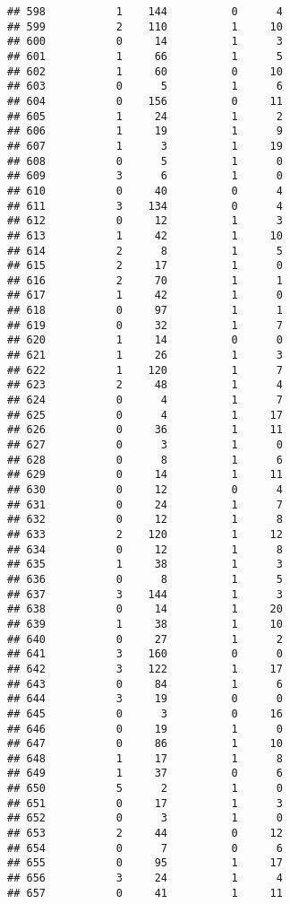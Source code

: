 \documentclass[]{article}
\begin{document}
\begin{verbatim}
## 598           1    144          0      4
## 599           2    110          1     10
## 600           0     14          1      3
## 601           1     66          1      5
## 602           1     60          0     10
## 603           0      5          1      6
## 604           0    156          0     11
## 605           1     24          1      2
## 606           1     19          1      9
## 607           1      3          1     19
## 608           0      5          1      0
## 609           3      6          1      0
## 610           0     40          0      4
## 611           3    134          0      4
## 612           0     12          1      3
## 613           1     42          1     10
## 614           2      8          1      5
## 615           2     17          1      0
## 616           2     70          1      1
## 617           1     42          1      0
## 618           0     97          1      1
## 619           0     32          1      7
## 620           1     14          0      0
## 621           1     26          1      3
## 622           1    120          1      7
## 623           2     48          1      4
## 624           0      4          1      7
## 625           0      4          1     17
## 626           0     36          1     11
## 627           0      3          1      0
## 628           0      8          1      6
## 629           0     14          1     11
## 630           0     12          0      4
## 631           0     24          1      7
## 632           0     12          1      8
## 633           2    120          1     12
## 634           0     12          1      8
## 635           1     38          1      3
## 636           0      8          1      5
## 637           3    144          1      3
## 638           0     14          1     20
## 639           1     38          1     10
## 640           0     27          1      2
## 641           3    160          0      0
## 642           3    122          1     17
## 643           0     84          1      6
## 644           3     19          0      0
## 645           0      3          0     16
## 646           0     19          1      0
## 647           0     86          1     10
## 648           1     17          1      8
## 649           1     37          0      6
## 650           5      2          1      0
## 651           0     17          1      3
## 652           0      3          1      0
## 653           2     44          0     12
## 654           0      7          0      6
## 655           0     95          1     17
## 656           3     24          1      4
## 657           0     41          1     11

\end{verbatim}
\end{document}
